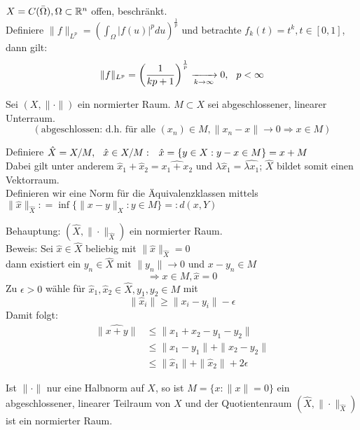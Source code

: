 \begin{beispiel}
$X = C(\bar\Omega), \Omega \subset \mathbb{R}^{n}$ offen, beschränkt. \\
Definiere $\| f \|_{L^{p}} = \left( \int_{\Omega} |f(u)|^{p} du \right)^{\frac{1}{p}}$ und betrachte $f_{k}(t) = t^k, t \in [0, 1]$, dann gilt:
 \[ \| f \|_{L^{p}} = \left( \frac{1}{kp + 1} \right)^{\frac{1}{p}} \xrightarrow[k \rightarrow \infty]{} 0, \hspace{0.25cm} p < \infty \]
\end{beispiel}

\begin{definition} \label{def:2.15-Quotientenraeume}
Sei $(X, \| \cdot \|)$ ein normierter Raum. $M \subset X$ sei abgeschlossener, linearer Unterraum. \[ (\text{abgeschlossen: d.h. für alle } (x_{n}) \in M, \| x_{n} - x \| \rightarrow 0 \Rightarrow x \in M) \]

Definiere $\hat X = X / M, \hspace{0.25cm} \hat x \in X/M: \hspace{0.25cm} \hat x = \{ y \in X: y - x \in M \} = x + M$ \\
Dabei gilt unter anderem $\hat x_{1} + \hat x_{2} = \widehat{x_{1} + x_{2}}$ und $\lambda \hat x_{1} = \widehat{\lambda x_{1}}$; $\hat X$ bildet somit einen Vektorraum. \\
Definieren wir eine Norm für die Äquivalenzklassen mittels $\| \hat x \|_{\hat X} : = \inf \{ \| x - y \|_{X}: y \in M \} =: d(x, Y)$

Behauptung: $(\hat X, \| \cdot \|_{\hat X})$ ein normierter Raum. \\
Beweis: Sei $\hat x \in \hat X$ beliebig mit $\| \hat x \|_{\hat X} = 0$ \\
 dann existiert ein $y_{n} \in \hat X \text{ mit } \| y_{n} \| \rightarrow 0$ und $x - y_{n} \in M$
	\[ \Rightarrow x \in M, \hat x = 0 \]
Zu $\epsilon > 0$ wähle für $\hat x_{1}, \hat x_{2} \in \hat X, y_{1}, y_{2} \in M$ mit
	\[ \| \hat x_{i} \| \geq \| x_{i} - y_{i} \| - \epsilon \] 
	Damit folgt:
	\begin{align*}
		\| \widehat{x + y} \| & \leq \| x_{1} + x_{2} - y_{1} - y_{2} \| \\
						  & \leq \| x_{1} - y_{1} \| + \| x_{2} - y_{2} \| \\
						  & \leq \| \hat x_{1} \| + \| \hat x_{2} \| + 2 \epsilon
	\end{align*}
\end{definition}

\begin{bemerkung}
Ist $\| \cdot \|$ nur eine Halbnorm auf $X$, so ist $M = \{ x: \| x \| = 0 \}$ ein abgeschlossener, linearer Teilraum von $X$ und der Quotientenraum $(\hat X, \| \cdot \|_{\hat X})$ ist ein normierter Raum.
\end{bemerkung}


